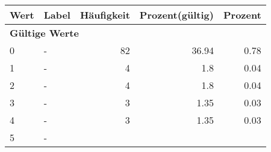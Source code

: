     \begin{longtable}{lXrrr}
     \toprule
     \textbf{Wert} & \textbf{Label} & \textbf{Häufigkeit} & \textbf{Prozent(gültig)} & \textbf{Prozent} \\
     \endhead
     \midrule
     \multicolumn{5}{l}{\textbf{Gültige Werte}}\\

     0 &
     \multicolumn{1}{X}{ -  } &


       \num{82} &
       \num[round-mode=places,round-precision=2]{36.94} &
         \num[round-mode=places,round-precision=2]{0.78} \\

     1 &
     \multicolumn{1}{X}{ -  } &


       \num{4} &
       \num[round-mode=places,round-precision=2]{1.8} &
         \num[round-mode=places,round-precision=2]{0.04} \\

     2 &
     \multicolumn{1}{X}{ -  } &


       \num{4} &
       \num[round-mode=places,round-precision=2]{1.8} &
         \num[round-mode=places,round-precision=2]{0.04} \\

     3 &
     \multicolumn{1}{X}{ -  } &


       \num{3} &
       \num[round-mode=places,round-precision=2]{1.35} &
         \num[round-mode=places,round-precision=2]{0.03} \\

     4 &
     \multicolumn{1}{X}{ -  } &


       \num{3} &
       \num[round-mode=places,round-precision=2]{1.35} &
         \num[round-mode=places,round-precision=2]{0.03} \\

     5 &
     \multicolumn{1}{X}{ -  } &



\end{longtable}
